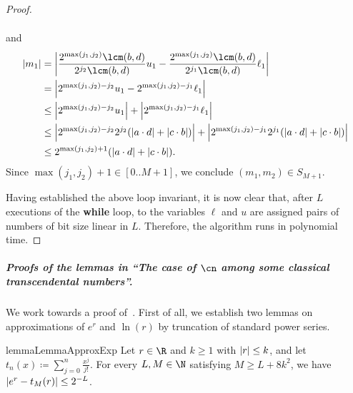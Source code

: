 \begin{proof}
\begin{description}
\begin{align*}
      \end{align*}
      and 
      \begin{align*}
       \abs{m_1} 
          &= \abs{\frac{2^{\max(j_1,j_2)}\lcm(b,d)}{2^{j_2} \lcm(b,d)}u_1 - \frac{2^{\max(j_1,j_2)}\lcm(b,d)}{2^{j_1} \lcm(b,d)}\ell_1}\\
          &= \abs{2^{\max(j_1,j_2)-j_2}u_1 - 2^{\max(j_1,j_2)-j_1}\ell_1}\\
          &\leq \abs{2^{\max(j_1,j_2)-j_2}u_1} + \abs{2^{\max(j_1,j_2)-j_1}\ell_1}\\
          &\leq \abs{2^{\max(j_1,j_2)-j_2}2^{j_2}(\abs{a \cdot d} + \abs{c \cdot b})} + \abs{2^{\max(j_1,j_2)-j_1}2^{j_1}(\abs{a \cdot d} + \abs{c \cdot b})}\\
          &\leq 2^{\max(j_1,j_2)+1}(\abs{a \cdot d} + \abs{c \cdot b}).
      \end{align*}
      Since $\max(j_1,j_2)+1 \in [0..M+1]$, we conclude $(m_1,m_2) \in S_{M+1}$.
  \end{description}
  Having established the above loop invariant, 
  it is now clear that, after $L$ executions 
  of the \textbf{while} loop, 
  to the variables $\ell$ and $u$ 
  are assigned pairs of numbers of bit size linear in $L$. Therefore, the algorithm runs in polynomial time.
\end{proof}

\subparagraph*{{Proofs of the lemmas in ``The case of $\cn$ among some classical transcendental numbers''.}}

We work towards a proof of~. First of all, we
establish two lemmas on approximations of $e^r$ and $\ln(r)$ by truncation of
standard power series.

\begin{restatable}{lemma}{LemmaApproxExp}
  \label{lemma:approx-exp}
  Let $r \in \R$ and $k \geq 1$ with $\left|r\right| \leq k$, 
  and let~$t_n(x) \coloneqq \sum_{j=0}^n \frac{x^j}{j!}$. 
  For every $L,M \in \N$ satisfying $M \geq L + 8 k^2$, we have $\left|e^r - t_M(r)\right| \leq 2^{-L}$.
\end{restatable}

